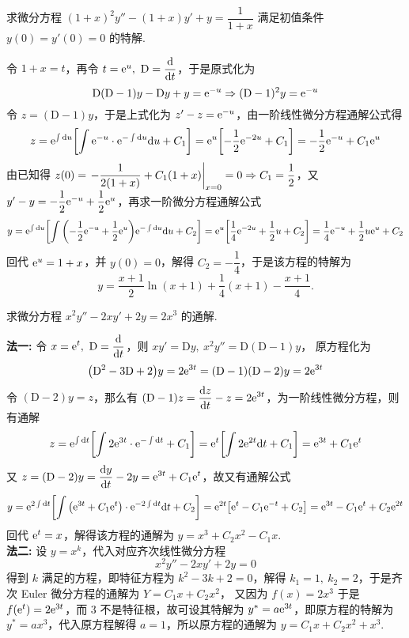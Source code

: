 \begin{example}
    求微分方程 $(1+x)^2y''-(1+x)y'+y=\dfrac{1}{1+x}$ 满足初值条件 $y(0)=y'(0)=0$ 的特解.
\end{example}
\begin{solution}
    令 $1+x=t$，再令 $t=\mathrm{e} ^u,~\mathrm{D}=\displaystyle\dv{t}$，于是原式化为
    $$\mathrm{D}(\mathrm{D}-1)y-\mathrm{D}y+y=\mathrm{e} ^{-u}\Rightarrow (\mathrm{D}-1)^2y=\mathrm{e} ^{-u}$$
    令 $z=(\mathrm{D}-1)y$，于是上式化为 $z'-z=\mathrm{e} ^{-u}$，由一阶线性微分方程通解公式得
    $$z=\mathrm{e} ^{\int\dd u}\qty[\int\mathrm{e} ^{-u}\cdot\mathrm{e} ^{-\int\dd u}\dd u+C_1]=\mathrm{e} ^u\qty[-\dfrac{1}{2}\mathrm{e} ^{-2u}+C_1]=-\dfrac{1}{2}\mathrm{e} ^{-u}+C_1\mathrm{e} ^u$$
    由已知得 $z(0)=\eval{-\dfrac{1}{2(1+x)}+C_1(1+x)}_{x=0}=0\Rightarrow C_1=\dfrac{1}{2}$，又 $y'-y=-\dfrac{1}{2}\mathrm{e} ^{-u}+\dfrac{1}{2}\mathrm{e} ^u$，再求一阶微分方程通解公式
    $$y=\mathrm{e} ^{\int\dd u}\qty[\int\qty(-\dfrac{1}{2}\mathrm{e} ^{-u}+\dfrac{1}{2}\mathrm{e} ^u)\mathrm{e} ^{-\int\dd u}\dd u+C_2]=\mathrm{e} ^u\qty[\dfrac{1}{4}\mathrm{e} ^{-2u}+\dfrac{1}{2}u+C_2]=\dfrac{1}{4}\mathrm{e} ^{-u}+\dfrac{1}{2}u\mathrm{e} ^u+C_2$$
    回代 $\mathrm{e} ^u=1+x$，并 $y(0)=0$，解得 $C_2=-\dfrac{1}{4}$，于是该方程的特解为 $$y=\dfrac{x+1}{2}\ln(x+1)+\dfrac{1}{4}(x+1)-\dfrac{x+1}{4}.$$
\end{solution}

\begin{example}
    \label{x2y2xy2y2x3}求微分方程 $x^2y''-2xy'+2y=2x^3$ 的通解.
\end{example}
\begin{solution}
    \textbf{法一: }令 $\displaystyle x=\mathrm{e} ^t,~\mathrm{D}=\dv{t}$，则 $xy'=\mathrm{D}y,~x^2y''=\mathrm{D}(\mathrm{D}-1)y$，
    原方程化为 $$\qty(\mathrm{D}^2-3\mathrm{D}+2)y=2\mathrm{e} ^{3t}=(\mathrm{D}-1)(\mathrm{D}-2)y=2\mathrm{e} ^{3t}$$
    令 $(\mathrm{D}-2)y=z$，那么有 $\displaystyle(\mathrm{D}-1)z=\dv{z}{t}-z=2\mathrm{e} ^{3t}$，为一阶线性微分方程，则有通解
    $$z=\mathrm{e} ^{\int\dd t}\qty[\int 2\mathrm{e} ^{3t}\cdot\mathrm{e} ^{-\int\dd t}+C_1]=\mathrm{e} ^t\qty[\int 2\mathrm{e} ^{2t}\dd t+C_1]=\mathrm{e} ^{3t}+C_1\mathrm{e} ^t$$
    又 $z=(\mathrm{D}-2)y=\displaystyle\dv{y}{t}-2y=\mathrm{e} ^{3t}+C_1\mathrm{e} ^t$，故又有通解公式
    $$y=\mathrm{e} ^{2\int\dd t}\qty[\int\qty(\mathrm{e} ^{3t}+C_1\mathrm{e} ^t)\cdot\mathrm{e} ^{-2\int\dd t}\dd t+C_2]=\mathrm{e} ^{2t}\qty[\mathrm{e} ^t-C_1\mathrm{e} ^{-t}+C_2]=\mathrm{e} ^{3t}-C_1\mathrm{e} ^t+C_2\mathrm{e} ^{2t}$$
    回代 $\mathrm{e} ^t=x$，解得该方程的通解为 $y=x^3+C_2x^2-C_1x.$\\
    \textbf{法二: }设 $y=x^k$，代入对应齐次线性微分方程 $$x^2y''-2xy'+2y=0$$
    得到 $k$ 满足的方程，即特征方程为 $k^2-3k+2=0$，解得 $k_1=1,~k_2=2$，于是齐次 Euler 微分方程的通解为 $Y=C_1x+C_2x^2$，
    又因为 $f(x)=2x^3$ 于是 $f\qty(\mathrm{e} ^t)=2\mathrm{e} ^{3t}$，而 3 不是特征根，故可设其特解为 $y^*=a\mathrm{e} ^{3t}$，即原方程的特解为 $y^*=ax^3$，代入原方程解得 $a=1$，所以原方程的通解为 $y=C_1x+C_2x^2+x^3.$
\end{solution}

